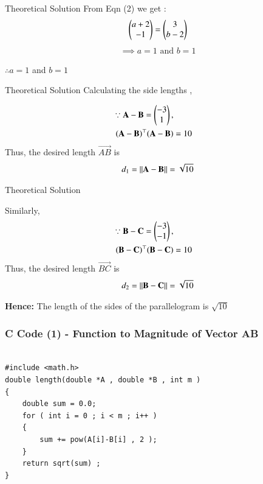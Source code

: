 \documentclass{beamer}
\begin{document}
\begin{frame}{Theoretical Solution}
From Eqn (2) we get : 
\begin{align}
    \myvec{a+2\\-1} = \myvec{3\\b-2} \\
\end{align}
\begin{align}
    \implies a = 1 \text{ and }  b = 1
 \end{align}

$\therefore a = 1$ and $ b = 1 $ 

\end{frame}

\begin{frame}{Theoretical Solution}
    Calculating the side lengths , 

\begin{align}
    \because \vec{A} - \vec{B} = \myvec{-3\\1} , \\
    (\vec{A} - \vec{B})^\top (\vec{A} - \vec{B}) &=  10
\end{align}
Thus, the desired length $\vec{AB}$ is 
\begin{align}
		d_1=\norm{\vec{A}-\vec{B}} =\sqrt{10}
\end{align}
\end{frame}

\begin{frame}{Theoretical Solution}

Similarly, 
\begin{align}
    \because \vec{B} - \vec{C} = \myvec{-3\\-1} , \\
    (\vec{B} - \vec{C})^\top (\vec{B} - \vec{C}) &=  10
\end{align}
Thus, the desired length $\vec{BC}$ is 
\begin{align}
		d_2=\norm{\vec{B}-\vec{C}} =\sqrt{10}
\end{align}

\textbf{Hence: } The length of the sides of the parallelogram is $ \sqrt{10} $
    
\end{frame}

\begin{frame}[fragile]
    \frametitle{C Code (1) - Function to Magnitude of Vector AB }

    \begin{lstlisting}

#include <math.h>
double length(double *A , double *B , int m )
{
    double sum = 0.0; 
    for ( int i = 0 ; i < m ; i++ )
    {
        sum += pow(A[i]-B[i] , 2 );
    }
    return sqrt(sum) ; 
}

    \end{lstlisting}
\end{frame}
\end{document}
